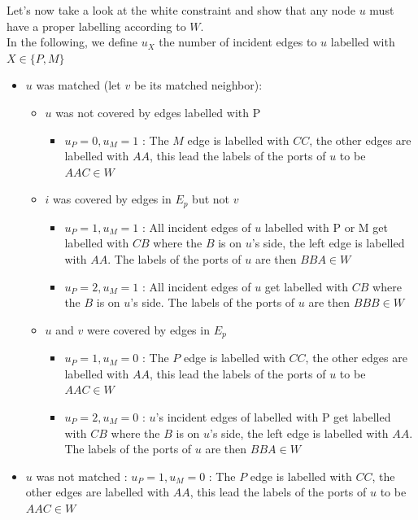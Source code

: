 Let's now take a look at the white constraint and show that any node $u$ must have a proper labelling according to $W$.\\
In the following, we define $u_X$ the number of incident edges to $u$ labelled with $X\in\{P,M\}$
\begin{itemize}
    \item $u$ was matched (let $v$ be its matched neighbor):
    \begin{itemize}
        \item $u$ was not covered by edges labelled with P
        \begin{itemize}
            \item $u_P=0,u_M=1$ : The $M$ edge is labelled with $CC$, the other edges are labelled with $AA$, this lead the labels of the ports of $u$ to be $AAC\in W$
        \end{itemize}
        \item $i$ was covered by edges in $E_p$ but not $v$
        \begin{itemize}
            \item $u_P=1,u_M=1$ : All incident edges of $u$ labelled with P or M get labelled with $CB$ where the $B$ is on $u$'s side, the left edge is labelled with $AA$. The labels of the ports of $u$ are then $BBA\in W$ 
            \item $u_P=2,u_M=1$ : All incident edges of $u$ get labelled with $CB$ where the $B$ is on $u$'s side. The labels of the ports of $u$ are then $BBB\in W$
        \end{itemize}
        \item $u$ and $v$ were covered by edges in $E_p$
        \begin{itemize}
            \item $u_P=1,u_M=0$ : The $P$ edge is labelled with $CC$, the other edges are labelled with $AA$, this lead the labels of the ports of $u$ to be $AAC\in W$
            \item $u_P=2,u_M=0$ : $u$'s incident edges of labelled with P get labelled with $CB$ where the $B$ is on $u$'s side, the left edge is labelled with $AA$. The labels of the ports of $u$ are then $BBA\in W$ 
        \end{itemize}
    \end{itemize}
    \item $u$ was not matched : $u_P=1,u_M=0$ : The $P$ edge is labelled with $CC$, the other edges are labelled with $AA$, this lead the labels of the ports of $u$ to be $AAC\in W$
\end{itemize}
    
